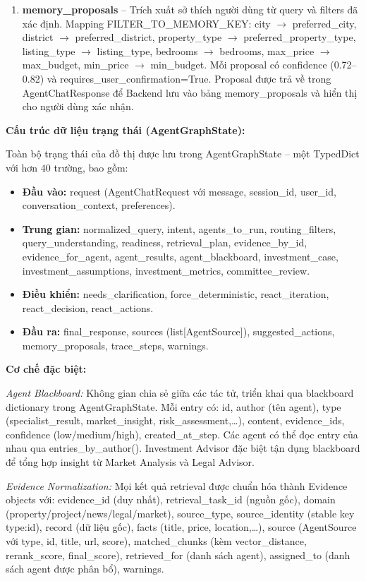 \begin{enumerate}[leftmargin=4em]
    \item[14.] \textbf{memory\_proposals} -- Trích xuất sở thích người dùng từ query và filters đã xác định. Mapping FILTER\_TO\_MEMORY\_KEY: city $\rightarrow$ preferred\_city, district $\rightarrow$ preferred\_district, property\_type $\rightarrow$ preferred\_property\_type, listing\_type $\rightarrow$ listing\_type, bedrooms $\rightarrow$ bedrooms, max\_price $\rightarrow$ max\_budget, min\_price $\rightarrow$ min\_budget. Mỗi proposal có confidence (0.72--0.82) và requires\_user\_confirmation=True. Proposal được trả về trong AgentChatResponse để Backend lưu vào bảng memory\_proposals và hiển thị cho người dùng xác nhận.
\end{enumerate}

\textbf{Cấu trúc dữ liệu trạng thái (AgentGraphState):}

Toàn bộ trạng thái của đồ thị được lưu trong AgentGraphState -- một TypedDict với hơn 40 trường, bao gồm:

\begin{itemize}
    \item \textbf{Đầu vào:} request (AgentChatRequest với message, session\_id, user\_id, conversation\_context, preferences).
    \item \textbf{Trung gian:} normalized\_query, intent, agents\_to\_run, routing\_filters, query\_understanding, readiness, retrieval\_plan, evidence\_by\_id, evidence\_for\_agent, agent\_results, agent\_blackboard, investment\_case, investment\_assumptions, investment\_metrics, committee\_review.
    \item \textbf{Điều khiển:} needs\_clarification, force\_deterministic, react\_iteration, react\_decision, react\_actions.
    \item \textbf{Đầu ra:} final\_response, sources (list[AgentSource]), suggested\_actions, memory\_proposals, trace\_steps, warnings.
\end{itemize}

\textbf{Cơ chế đặc biệt:}

\textit{Agent Blackboard:} Không gian chia sẻ giữa các tác tử, triển khai qua blackboard dictionary trong AgentGraphState. Mỗi entry có: id, author (tên agent), type (specialist\_result, market\_insight, risk\_assessment,\dots), content, evidence\_ids, confidence (low/medium/high), created\_at\_step. Các agent có thể đọc entry của nhau qua entries\_by\_author(). Investment Advisor đặc biệt tận dụng blackboard để tổng hợp insight từ Market Analysis và Legal Advisor.

\textit{Evidence Normalization:} Mọi kết quả retrieval được chuẩn hóa thành Evidence objects với: evidence\_id (duy nhất), retrieval\_task\_id (nguồn gốc), domain (property/project/news/legal/market), source\_type, source\_identity (stable key type:id), record (dữ liệu gốc), facts (title, price, location,\dots), source (AgentSource với type, id, title, url, score), matched\_chunks (kèm vector\_distance, rerank\_score, final\_score), retrieved\_for (danh sách agent), assigned\_to (danh sách agent được phân bổ), warnings.

